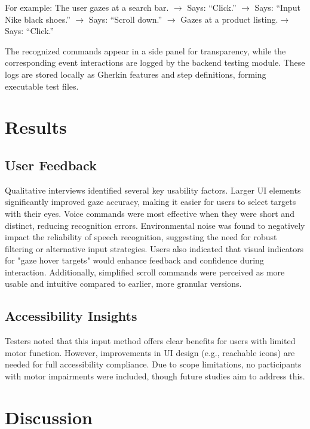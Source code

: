 For example: The user gazes at a search bar. $\rightarrow$ Says: “Click.” $\rightarrow$ Says: “Input Nike black shoes.” $\rightarrow$ Says: “Scroll down.” $\rightarrow$ Gazes at a product listing.$\rightarrow$ Says: “Click.”

The recognized commands appear in a side panel for transparency, while the corresponding event interactions are logged by the backend testing module. These logs are stored locally as Gherkin features and step definitions, forming executable test files.


\section{Results}

\subsection{User Feedback}

Qualitative interviews identified several key usability factors. Larger UI elements significantly improved gaze accuracy, making it easier for users to select targets with their eyes. Voice commands were most effective when they were short and distinct, reducing recognition errors. Environmental noise was found to negatively impact the reliability of speech recognition, suggesting the need for robust filtering or alternative input strategies. Users also indicated that visual indicators for "gaze hover targets" would enhance feedback and confidence during interaction. Additionally, simplified scroll commands were perceived as more usable and intuitive compared to earlier, more granular versions.

\subsection{Accessibility Insights}

Testers noted that this input method offers clear benefits for users with limited motor function. However, improvements in UI design (e.g., reachable icons) are needed for full accessibility compliance. Due to scope limitations, no participants with motor impairments were included, though future studies aim to address this.


\section{Discussion}

